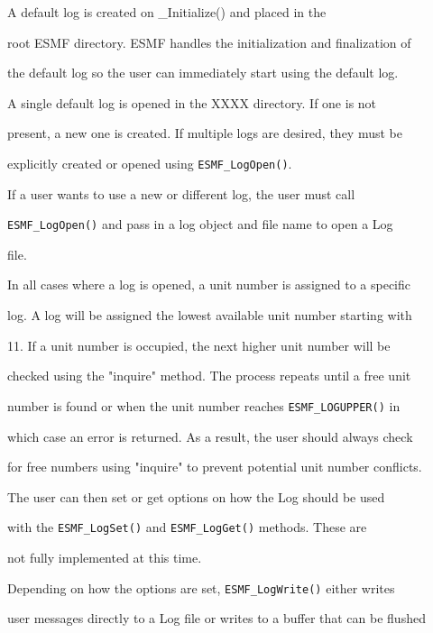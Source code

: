 




A default log is created on {\ttESMF\_Initialize()} and placed in the

root ESMF directory.  ESMF handles the initialization and finalization of

the default log so the user can immediately start using the default log.

A single default log is opened in the XXXX directory.  If one is not 

present, a new one is created.  If multiple logs are desired, they must be

explicitly created or opened using {\tt ESMF\_LogOpen()}.


If a user wants to use a new or different log, the user must call

{\tt ESMF\_LogOpen()} and pass in a log object and file name to open a Log 

file.  


In all cases where a log is opened, a unit number is assigned to a specific

log.  A log will be assigned the lowest available unit number starting with

11.  If a unit number is occupied, the next higher unit number will be 

checked using the "inquire" method.  The process repeats until a free unit
 
number is found or when the unit number reaches {\tt ESMF\_LOGUPPER()} in
 
which case an error is returned.  As a result, the user should always check

for free numbers using "inquire" to prevent potential unit number conflicts.


The user can then set or get options on how the Log should be used 

with the {\tt ESMF\_LogSet()} and {\tt ESMF\_LogGet()} methods.  These are 

not fully implemented at this time. 


Depending on how the options are set, {\tt ESMF\_LogWrite()} either writes

user messages directly to a Log file or writes to a buffer that can be flushed

